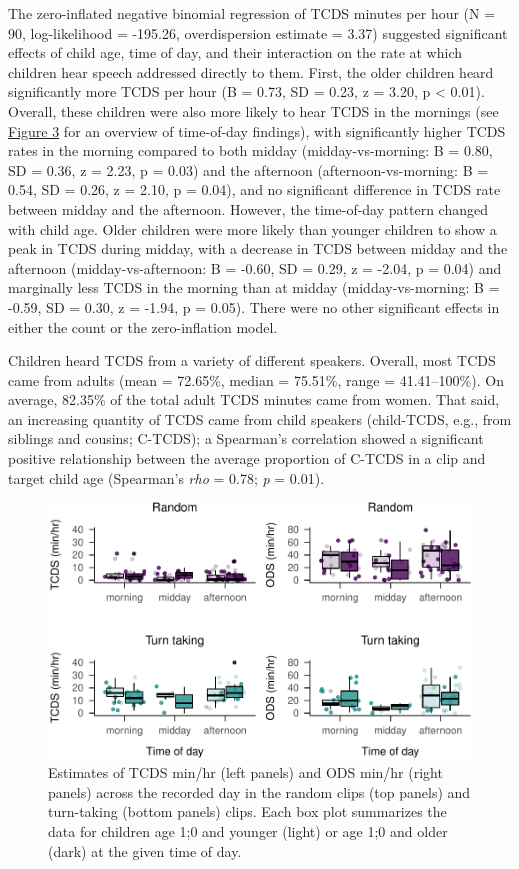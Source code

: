 \documentclass[,man,floatsintext]{apa6}
\begin{document}
The zero-inflated negative binomial regression of TCDS minutes per hour
(N = 90, log-likelihood = -195.26, overdispersion estimate = 3.37)
suggested significant effects of child age, time of day, and their
interaction on the rate at which children hear speech addressed directly
to them. First, the older children heard significantly more TCDS per
hour (B = 0.73, SD = 0.23, z = 3.20, p \textless{} 0.01). Overall, these
children were also more likely to hear TCDS in the mornings (see
\protect\hyperlink{fig3}{Figure 3} for an overview of time-of-day
findings), with significantly higher TCDS rates in the morning compared
to both midday (midday-vs-morning: B = 0.80, SD = 0.36, z = 2.23, p =
0.03) and the afternoon (afternoon-vs-morning: B = 0.54, SD = 0.26, z =
2.10, p = 0.04), and no significant difference in TCDS rate between
midday and the afternoon. However, the time-of-day pattern changed with
child age. Older children were more likely than younger children to show
a peak in TCDS during midday, with a decrease in TCDS between midday and
the afternoon (midday-vs-afternoon: B = -0.60, SD = 0.29, z = -2.04, p =
0.04) and marginally less TCDS in the morning than at midday
(midday-vs-morning: B = -0.59, SD = 0.30, z = -1.94, p = 0.05). There
were no other significant effects in either the count or the
zero-inflation model.

Children heard TCDS from a variety of different speakers. Overall, most
TCDS came from adults (mean = 72.65\%, median = 75.51\%, range =
41.41--100\%). On average, 82.35\% of the total adult TCDS minutes came
from women. That said, an increasing quantity of TCDS came from child
speakers (child-TCDS, e.g., from siblings and cousins; C-TCDS); a
Spearman's correlation showed a significant positive relationship
between the average proportion of C-TCDS in a clip and target child age
(Spearman's \emph{rho} = 0.78; \emph{p} = 0.01).

\begin{figure}
\centering
\includegraphics{Yeli-CLE_files/figure-latex/fig3-1.pdf}
\caption{\label{fig:fig3}Estimates of TCDS min/hr (left panels) and ODS
min/hr (right panels) across the recorded day in the random clips (top
panels) and turn-taking (bottom panels) clips. Each box plot summarizes
the data for children age 1;0 and younger (light) or age 1;0 and older
(dark) at the given time of day.}
\end{figure}
\end{document}
